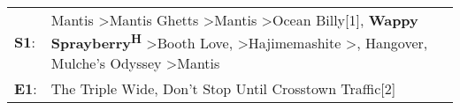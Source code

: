 \begin{supertabular}{p{0.03\textwidth}p{0.92\textwidth}}
 \textbf{S1}:  &  Mantis\textsuperscript{} \textgreater \enspace Mantis Ghetts\textsuperscript{} \textgreater \enspace Mantis\textsuperscript{} \textgreater \enspace Ocean Billy[1]\textsuperscript{}, \enspace \textbf{Wappy Sprayberry\textsuperscript{H}} \textgreater \enspace Booth Love\textsuperscript{}, \textsuperscript{} \textgreater \enspace Hajimemashite\textsuperscript{} \textgreater {}\textsuperscript{}, \enspace Hangover\textsuperscript{}, \enspace Mulche's Odyssey\textsuperscript{} \textgreater \enspace Mantis\textsuperscript{}  \enspace  \\
 \textbf{E1}:  &                                                                                                                                                                                                                                                                                                                                                                                                                                                                  The Triple Wide\textsuperscript{}, \enspace Don't Stop Until Crosstown Traffic[2]\textsuperscript{}  \enspace  \\
\end{supertabular}
